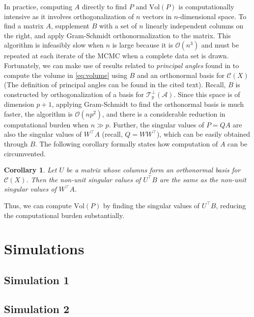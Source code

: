 \documentclass[12pt]{article}
\newcommand{\mc}{\mathcal}
\newtheorem{corollary}[theorem]{\bf Corollary}
\begin{document}
In practice, computing $A$ directly to find $P$ and $\text{Vol} (P)$ is computationally intensive as it involves orthogonalization of $n$ vectors in $n$-dimensional space. 
To find a matrix $A$, supplement $B$ with a set of $n$ linearly independent columns on the right, and apply Gram-Schmidt 
orthonormalization to the matrix.  This algorithm is infeasibly slow when $n$ is large because it is $\mc O(n^3)$ and must be repeated at each
iterate of the MCMC when a complete data set is drawn.  
Fortunately, we can make use of results related to \textit{principal angles} found in \cite{miao1992} to compute the volume in \eqref{eq:volume} using $B$ and an orthonormal basis for $\mc C (X)$ (The definition of principal angles can be found in the cited text). Recall, $B$ is constructed by orthogonalization of a basis for $\mc T_{y}^\perp(\mc A)$. Since this space is of dimension $p+1$, applying Gram-Schmidt to find the orthonormal basis is much faster, the algorithm is $\mc O(np^2)$, and there is a 
considerable reduction in computational burden when $n \gg p$. 
Further, the singular values of $P=QA$ are also the singular values of
$W^\top A$ (recall, $Q=WW^{\top}$), which can be easily obtained through $B$.
The following corollary formally states how computation of $A$ can be circumvented. 
\begin{corollary}
\label{theorem:sings}
Let $U$ be a matrix whose columns
form an orthonormal basis for $\mc C (X)$. Then the non-unit singular
values of $U^\top B$ are the same as the non-unit singular values of $W^\top A$.  
\end{corollary} 
\noindent Thus, we can compute $\text{Vol} (P)$ by finding the singular values of $U^\top B$, reducing the computational burden substantially. 


%
%
\section{Simulations}
\subsection{Simulation 1}

\subsection{Simulation 2}


%
%
\end{document}
